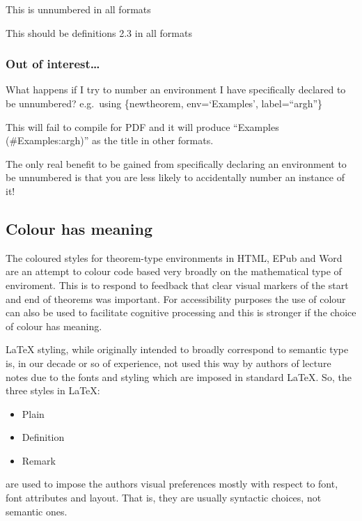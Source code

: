 \documentclass[
  12pt,
  a4paper]{extarticle}
\providecommand{\tightlist}{%
  \setlength{\itemsep}{0pt}\setlength{\parskip}{0pt}}
\theoremstyle{plain}
\theoremstyle{definition}
\theoremstyle{plain}
\theoremstyle{plain}
\theoremstyle{plain}
\theoremstyle{plain}
\theoremstyle{definition}
\theoremstyle{definition}
\theoremstyle{remark}
\theoremstyle{remark}
\let\BeginKnitrBlock\begin \let\EndKnitrBlock\end
\renewcommand{\;}{\,}
\begin{document}
\BeginKnitrBlock{Definitions*}
{}This is unnumbered in all formats
\EndKnitrBlock{Definitions*}

\BeginKnitrBlock{Definitions}
{\label{Def:def3}}This should be definitions 2.3 in all formats
\EndKnitrBlock{Definitions}

\hypertarget{out-of-interest}{%
\subsubsection{Out of interest\ldots{}}\label{out-of-interest}}

What happens if I try to number an environment I have specifically declared to be unnumbered? e.g.~using \{newtheorem, env=`Examples', label=``argh''\}

This will fail to compile for PDF and it will produce ``Examples (\#Examples:argh)'' as the title in other formats.

The only real benefit to be gained from specifically declaring an environment to be unnumbered is that you are less likely to accidentally number an instance of it!

\hypertarget{colour-has-meaning}{%
\subsection{Colour has meaning}\label{colour-has-meaning}}

The coloured styles for theorem-type environments in HTML, EPub and Word are an attempt to colour code based very broadly on the mathematical type of enviroment. This is to respond to feedback that clear visual markers of the start and end of theorems was important. For accessibility purposes the use of colour can also be used to facilitate cognitive processing and this is stronger if the choice of colour has meaning.

LaTeX styling, while originally intended to broadly correspond to semantic type is, in our decade or so of experience, not used this way by authors of lecture notes due to the fonts and styling which are imposed in standard LaTeX. So, the three styles in LaTeX:

\begin{itemize}
\tightlist
\item
  Plain
\item
  Definition
\item
  Remark
\end{itemize}

are used to impose the authors visual preferences mostly with respect to font, font attributes and layout. That is, they are usually syntactic choices, not semantic ones.
\end{document}
